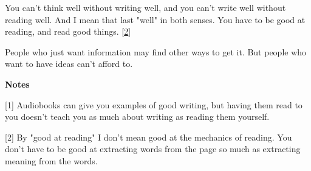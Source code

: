 You can't think well without writing
                  well, and you can't write well without reading well. And I
                  mean that last "well" in both senses. You have to be good at
                  reading, and read good things.
                  [\href{\#f2n}{2}]

People who just want information may find other
                  ways to get it. But people who want to have ideas can't afford
                  to.











\textbf{Notes}

[1] Audiobooks can give you examples of good writing, but
                  having them read to you doesn't teach you as much about
                  writing as reading them yourself.

[2] By "good at reading" I don't mean good at the mechanics of
                  reading. You don't have to be good at extracting words from
                  the page so much as extracting meaning from the words.


              
            
          
